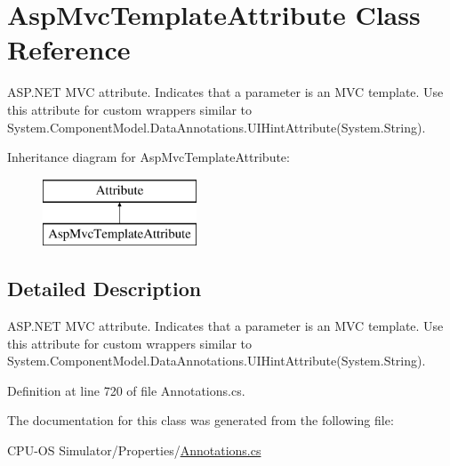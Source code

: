 \hypertarget{class_asp_mvc_template_attribute}{}\section{Asp\+Mvc\+Template\+Attribute Class Reference}
\label{class_asp_mvc_template_attribute}


A\+S\+P.\+N\+E\+T M\+V\+C attribute. Indicates that a parameter is an M\+V\+C template. Use this attribute for custom wrappers similar to {\ttfamily System.\+Component\+Model.\+Data\+Annotations.\+U\+I\+Hint\+Attribute(System.\+String)}.  


Inheritance diagram for Asp\+Mvc\+Template\+Attribute\+:\begin{figure}[H]
\begin{center}
\leavevmode
\includegraphics[height=2.000000cm]{class_asp_mvc_template_attribute}
\end{center}
\end{figure}


\subsection{Detailed Description}
A\+S\+P.\+N\+E\+T M\+V\+C attribute. Indicates that a parameter is an M\+V\+C template. Use this attribute for custom wrappers similar to {\ttfamily System.\+Component\+Model.\+Data\+Annotations.\+U\+I\+Hint\+Attribute(System.\+String)}. 



Definition at line 720 of file Annotations.\+cs.



The documentation for this class was generated from the following file\+:\begin{DoxyCompactItemize}
\item 
C\+P\+U-\/\+O\+S Simulator/\+Properties/\hyperlink{_annotations_8cs}{Annotations.\+cs}\end{DoxyCompactItemize}
